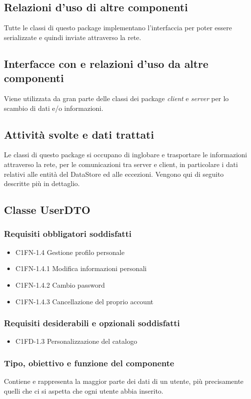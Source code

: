 \subsection*{Relazioni d'uso di altre componenti} Tutte le classi di questo
package implementano l'interfaccia  per poter essere
serializzate e quindi inviate attraverso la rete. 
\subsection*{Interfacce con e relazioni d'uso da altre componenti} Viene
utilizzata da gran parte delle classi dei package \emph{client} e \emph{server}
per lo scambio di dati e/o informazioni. 
\subsection*{Attivit\`a svolte e dati trattati}
Le classi di questo package si occupano di inglobare e trasportare
le informazioni attraverso la rete, per le comunicazioni tra server e client,
in particolare i dati relativi alle entit\`a del DataStore ed alle eccezioni.
Vengono qui di seguito descritte pi\`u in dettaglio.

\subsection{Classe UserDTO}
\subsubsection*{Requisiti obbligatori soddisfatti}
\begin{itemize}
	\item C1FN-1.4 Gestione profilo personale
	\item C1FN-1.4.1 Modifica informazioni personali
	\item C1FN-1.4.2 Cambio password
	\item C1FN-1.4.3 Cancellazione del proprio account
\end{itemize}
\subsubsection*{Requisiti desiderabili e opzionali soddisfatti}
\begin{itemize}
    \item C1FD-1.3 Personalizzazione del catalogo
\end{itemize}
\subsubsection*{Tipo, obiettivo e funzione del componente}
Contiene e rappresenta la maggior parte dei dati di un utente, pi\`u
precisamente quelli che ci si aspetta che ogni utente abbia inserito.
